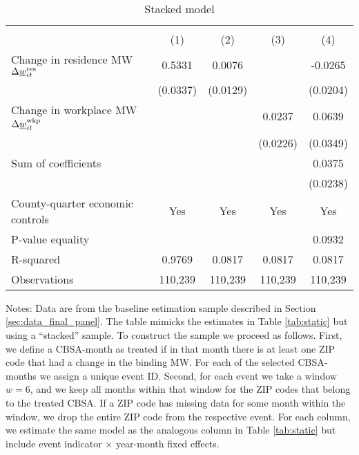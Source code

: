 \begin{table}[hbt!] \centering
    \caption{Stacked model}
    \label{tab:stacked_w6}
    \begin{tabular}{l*{4}{c}}
        \toprule
        & 
            &  \\ \cmidrule(lr){2-2}\cmidrule(lr){3-5}
                                            & (1)   & (2)   & (3)   & (4)            \\ \midrule
        Change in residence MW 
                    $\Delta\underline{w}_{it}^{\text{res}}$  &  0.5331  &  0.0076  &       &  -0.0265     \\
                                            & (0.0337) & (0.0129) &       & (0.0204)    \\
        Change in workplace MW 
                    $\Delta\underline{w}_{it}^{\text{wkp}}$ &       &       &  0.0237  & 0.0639      \\
                                            &       &       & (0.0226) & (0.0349)    \\ \midrule
        Sum of coefficients                &       &       &       &  0.0375     \\
                                            &       &       &       & (0.0238)    \\ \midrule
        County-quarter economic controls   &  Yes  & Yes   & Yes   & Yes      \\
        P-value equality                   &       &       &       & 0.0932      \\
        R-squared                          &  0.9769  &  0.0817  &  0.0817  & 0.0817      \\
        Observations                       & 110,239  & 110,239  & 110,239  & 110,239     \\\bottomrule
    \end{tabular}

    \begin{minipage}{.95\textwidth} \footnotesize
        \vspace{2mm}
        Notes: 
        Data are from the baseline estimation sample described in Section 
        \ref{sec:data_final_panel}.
        The table mimicks the estimates in Table \ref{tab:static} but using a 
        ``stacked'' sample.
        To construct the sample we proceed as follows.
        First, we define a CBSA-month as treated if in that month there is at 
        least one ZIP code that had a change in the binding MW.
        For each of the selected CBSA-months we assign a unique event ID. 
        Second, for each event we take a window $w = 6$, and we keep all months 
        within that window for the ZIP codes that belong to the treated CBSA.
        If a ZIP code has missing data for some month within the window, we drop 
        the entire ZIP code from the respective event.
        For each column, we estimate the same model as the analogous column in 
        Table \ref{tab:static} but include event indicator $\times$ year-month
        fixed effects.
    \end{minipage}
\end{table}
